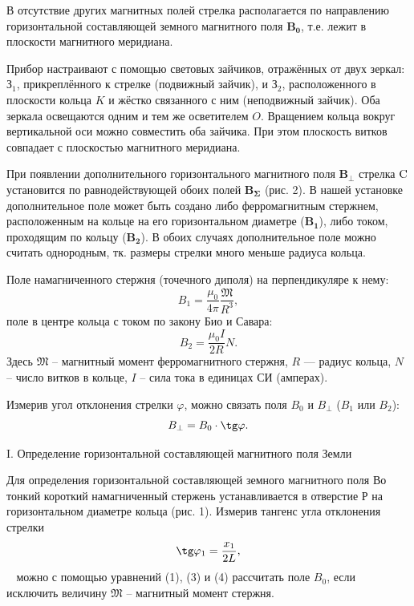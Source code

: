 \documentclass[a4paper,12pt]{article} %
\renewcommand{\phi}{\ensuremath{\varphi}} %
\theoremstyle{plain} %
\theoremstyle{definition} %
\theoremstyle{remark} %
\renewcommand{\phi}{\ensuremath{\varphi}}
\begin{document}
В отсутствие других магнитных полей стрелка располагается по направлению горизонтальной составляющей земного магнитного поля $\mathbf{B_0}$, т.е. лежит в плоскости магнитного меридиана.

Прибор настраивают с помощью световых зайчиков, отражённых
от двух зеркал: З$_1$, прикреплённого к стрелке (подвижный зайчик), и
З$_2$, расположенного в плоскости кольца $K$ и жёстко связанного с ним
(неподвижный зайчик). Оба зеркала освещаются одним и тем же осветителем $O$. Вращением кольца вокруг вертикальной оси можно совместить оба зайчика. При этом плоскость витков совпадает с плоскостью
магнитного меридиана.

При появлении дополнительного горизонтального магнитного поля $\mathbf{B_{\perp}}$ стрелка
$\rm C$ установится по равнодействующей обоих полей $\mathbf{B_{\Sigma}}$ (рис. 2). В нашей установке
дополнительное поле может быть создано
либо ферромагнитным стержнем, расположенным на кольце на его горизонтальном
диаметре ($\mathbf{B_1}$), либо током, проходящим
по кольцу ($\mathbf{B_2}$). В обоих случаях дополнительное поле можно считать однородным,
тк. размеры стрелки много меньше радиуса кольца.

Поле намагниченного стержня (точечного диполя) на перпендикуляре к нему:
\begin{equation}
	B_1=\dfrac{\mu_0}{4\pi }\dfrac{\mathfrak{M}}{R^3},
\end{equation}
поле в центре кольца с током по закону Био и Савара:
\begin{equation}
B_2=\dfrac{\mu_0 I}{2R}N.
\end{equation}
Здесь $\mathfrak{M}$ -- магнитный момент ферромагнитного стержня, $R$ — радиус
кольца, $N$ -- число витков в кольце, $I$ -- сила тока в единицах СИ (амперах).

Измерив угол отклонения стрелки $\phi$, можно связать поля $B_0$ и $B_\perp$ ($B_1$ или $B_2$):
\begin{equation}
B_{\perp}=B_0\cdot \tg \phi.
\end{equation}


\textsf{I. Определение горизонтальной составляющей магнитного поля Земли}

Для определения горизонтальной составляющей земного магнитного поля Во тонкий короткий намагниченный стержень устанавливается в отверстие Р на горизонтальном диаметре кольца (рис. 1). Измерив
тангенс угла отклонения стрелки
\begin{equation}
\tg \phi_1=\dfrac{x_1}{2L},
\end{equation} 
\noindent можно с помощью уравнений (1), (3) и (4) рассчитать поле $B_0$, если
исключить величину $\mathfrak{M}$ -- магнитный момент стержня.
\end{document}
